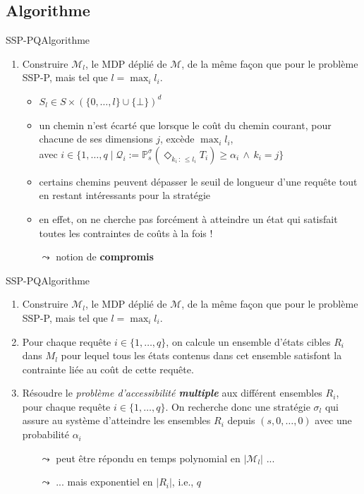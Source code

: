 \documentclass[compress]{beamer}
\theoremstyle{theorem}%
\begin{document}
\subsection{Algorithme}
\begin{frame}{SSP-PQ}{Algorithme}
  \begin{enumerate}
    \item Construire $\mathcal{M}_l$, le MDP déplié de $\mathcal{M}$, de la même
      façon que pour le problème SSP-P, mais tel que $l = \max_i l_i$.
      \begin{itemize}
        \item $S_{l} \in S \times (\{ 0, \dots, l \} \cup \{ \bot \})^d$
        \item un chemin n'est écarté que lorsque le coût du chemin courant, pour chacune de ses dimensions $j$, excède $\max_i l_i$,\\ { \footnotesize avec
          $i \in \{ 1, \dots, q \; | \; \mathcal{Q}_i := \mathbb{P}_s^\sigma(\Diamond_{k_i\, : \, \leq l_i} T_i) \geq \alpha_i \, \wedge \, k_i = j \}$}
        \item certains chemins peuvent dépasser le seuil de longueur d'une requête
        tout en restant intéressants pour la stratégie
        \item en effet, on ne cherche pas forcément à atteindre un état qui satisfait toutes les contraintes de coûts à la fois !
        \item[$\leadsto$] notion de \textbf{\color{fibeamer@orange}compromis}
      \end{itemize}
  \end{enumerate}
\end{frame}

\begin{frame}{SSP-PQ}{Algorithme}
  \begin{enumerate}
    \small
    \item Construire $\mathcal{M}_l$, le MDP déplié de $\mathcal{M}$, de la même
      façon que pour le problème SSP-P, mais tel que $l = \max_i l_i$.
    \item Pour chaque requête $i \in \{1, \dots, q\}$, on calcule un ensemble
      d'états cibles $R_i$ dans $M_l$ pour lequel tous les états contenus dans
      cet ensemble satisfont la contrainte liée au coût de cette requête.
    \item Résoudre le \textit{\color{fibeamer@orange}problème d'accessibilité \textbf{multiple}} aux différent ensembles $R_i$, pour chaque requête $i \in \{1, \dots, q\}$.
    On recherche donc une stratégie $\sigma_l$ qui assure au système d'atteindre les ensembles $R_i$ depuis $(s, 0, \dots, 0)$ avec une probabilité $\alpha_i$
    \begin{itemize}
      \item[$\leadsto$] peut être répondu en temps \alert{polynomial en $|\mathcal{M}_{l}|$} ...
      \item[$\leadsto$] ... mais \alert{exponentiel en $|R_i|$, i.e., $q$}
    \end{itemize}
  \end{enumerate}
\end{frame}
\end{document}
